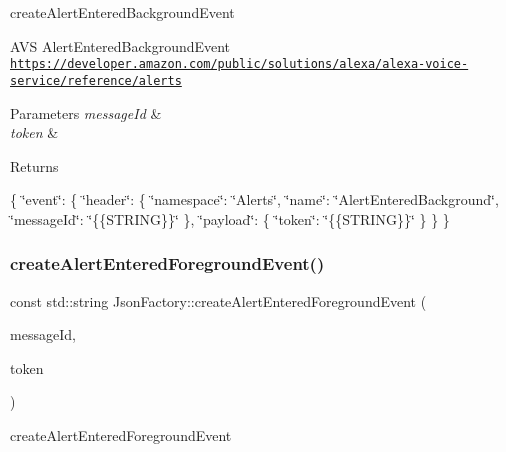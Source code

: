 create\+Alert\+Entered\+Background\+Event 

A\+VS Alert\+Entered\+Background\+Event \href{https://developer.amazon.com/public/solutions/alexa/alexa-voice-service/reference/alerts}{\tt https\+://developer.\+amazon.\+com/public/solutions/alexa/alexa-\/voice-\/service/reference/alerts} 
\begin{DoxyParams}{Parameters}
{\em message\+Id} & \\
\hline
{\em token} & \\
\hline
\end{DoxyParams}
\begin{DoxyReturn}{Returns}

\end{DoxyReturn}
\{ \char`\"{}event\char`\"{}\+: \{ \char`\"{}header\char`\"{}\+: \{ \char`\"{}namespace\char`\"{}\+: \char`\"{}\+Alerts\char`\"{}, \char`\"{}name\char`\"{}\+: \char`\"{}\+Alert\+Entered\+Background\char`\"{}, \char`\"{}message\+Id\char`\"{}\+: \char`\"{}\{\{\+S\+T\+R\+I\+N\+G\}\}\char`\"{} \}, \char`\"{}payload\char`\"{}\+: \{ \char`\"{}token\char`\"{}\+: \char`\"{}\{\{\+S\+T\+R\+I\+N\+G\}\}\char`\"{} \} \} \} \mbox{\label{classAVSJson_1_1JsonFactory_afa1846a4bb4a30124c9bf9852c5618d7}} 
\subsubsection{\texorpdfstring{create\+Alert\+Entered\+Foreground\+Event()}{createAlertEnteredForegroundEvent()}}
{\footnotesize\ttfamily const std\+::string Json\+Factory\+::create\+Alert\+Entered\+Foreground\+Event (\begin{DoxyParamCaption}\item[{const std\+::string \&}]{message\+Id,  }\item[{const std\+::string \&}]{token }\end{DoxyParamCaption})}



create\+Alert\+Entered\+Foreground\+Event 


